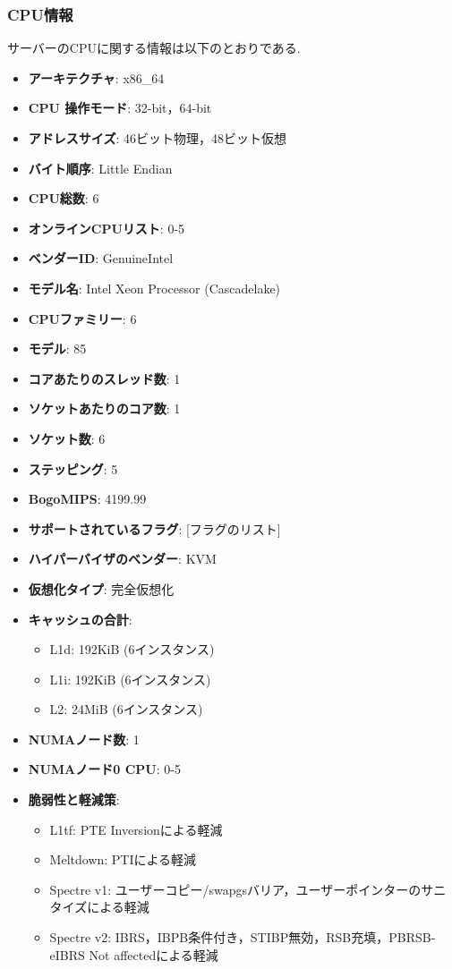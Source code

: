 \documentclass[b5paper,12pt,dvipdfmx]{jsreport}
\begin{document}
\subsubsection{CPU情報}
サーバーのCPUに関する情報は以下のとおりである.
\begin{itemize}
    \item \textbf{アーキテクチャ}: x86\_64
    \item \textbf{CPU 操作モード}: 32-bit，64-bit
    \item \textbf{アドレスサイズ}: 46ビット物理，48ビット仮想
    \item \textbf{バイト順序}: Little Endian

    \item \textbf{CPU総数}: 6
    \item \textbf{オンラインCPUリスト}: 0-5
    \item \textbf{ベンダーID}: GenuineIntel
    \item \textbf{モデル名}: Intel Xeon Processor (Cascadelake)
    \item \textbf{CPUファミリー}: 6
    \item \textbf{モデル}: 85
    \item \textbf{コアあたりのスレッド数}: 1
    \item \textbf{ソケットあたりのコア数}: 1
    \item \textbf{ソケット数}: 6
    \item \textbf{ステッピング}: 5
    \item \textbf{BogoMIPS}: 4199.99
    \item \textbf{サポートされているフラグ}: [フラグのリスト]

    \item \textbf{ハイパーバイザのベンダー}: KVM
    \item \textbf{仮想化タイプ}: 完全仮想化

    \item \textbf{キャッシュの合計}:
        \begin{itemize}
            \item L1d: 192KiB (6インスタンス)
            \item L1i: 192KiB (6インスタンス)
            \item L2: 24MiB (6インスタンス)
        \end{itemize}

    \item \textbf{NUMAノード数}: 1
    \item \textbf{NUMAノード0 CPU}: 0-5

    \item \textbf{脆弱性と軽減策}:
        \begin{itemize}
            \item L1tf: PTE Inversionによる軽減
            \item Meltdown: PTIによる軽減
            \item Spectre v1: ユーザーコピー/swapgsバリア，ユーザーポインターのサニタイズによる軽減
            \item Spectre v2: IBRS，IBPB条件付き，STIBP無効，RSB充填，PBRSB-eIBRS Not affectedによる軽減
        \end{itemize}
\end{itemize}
\end{document}
